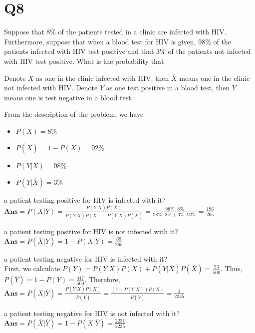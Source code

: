 \documentclass[11pt]{article}
\begin{document}
\section*{Q8}
Suppose that 8\% of the patients tested in a clinic are infected
with HIV. Furthermore, suppose that when a blood test for
HIV is given, 98\% of the patients infected with HIV test
positive and that 3\% of the patients not infected with HIV test
positive. What is the probability that
\begin{solution}
    Denote $X$ as one in the clinic infected with HIV, then $\overline{X}$ means 
    one in the clinic not infected with HIV.
    Denote $Y$ as one test positive in a blood test, then $\overline{Y}$ 
    means one is test negative in a blood test.

    From the description of the problem, we have 
    \begin{itemize}
        \item $P(X)=8\%$ 
        \item $P(\overline{X})=1-P(X)=92\%$
        \item $P(Y\vert X)=98\%$
        \item  $P(Y\vert \overline{X})=3\%$
    \end{itemize}
\begin{qparts}
    \item a patient testing positive for HIV is infected with it?\\
    $\textbf{Ans}=P(X\vert Y)=\frac{P(Y\vert X)P(X)}{P(Y\vert X)P(X)+P(Y\vert \overline{X})P(\overline{X})}=\frac{98\%\cdot 8\%}{98\%\cdot 8\%+3\%\cdot 92\%}=\frac{196}{265}$

    \item a patient testing positive for HIV is not infected with it?\\
    $\textbf{Ans}=P(\overline{X}\vert Y)=1-P(X\vert Y)=\frac{69}{265}$

    \item a patient testing negative for HIV is infected with it?\\
    First, we calculate $P(Y)=P(Y\vert X)P(X)+P(Y\vert \overline{X})P(\overline{X})=\frac{53}{500}$. Thus, $P(\overline{Y})=1-P(Y)=\frac{447}{500}$.
    Therefore, $\textbf{Ans}=P(X\vert \overline{Y})=\frac{P(\overline{Y}\vert X)P(X)}{P(\overline{Y})}=\frac{(1-P(Y\vert X))P(X)}{P(\overline{Y})}=\frac{4}{2235}$

    \item a patient testing negative for HIV is not infected with it?\\
    $\textbf{Ans}=P(\overline{X}\vert \overline{Y})=1-P(X\vert \overline{Y})=\frac{2231}{2235}$

\end{qparts}
\end{solution}
\end{document}

